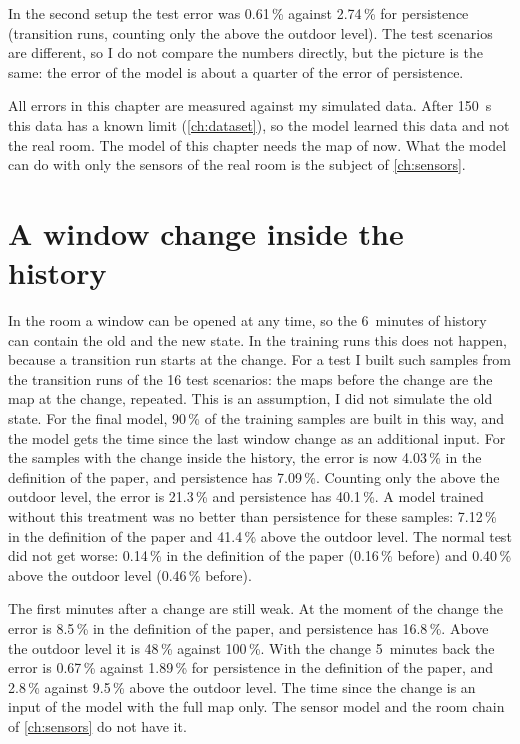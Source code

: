 In the second setup the test error was 0.61\,\% against 2.74\,\% for persistence (transition runs, counting only the
\cotwo{} above the outdoor level). The test scenarios are different, so I do not compare the numbers directly, but
the picture is the same: the error of the model is about a quarter of the error of persistence.

All errors in this chapter are measured against my simulated data. After 150~s this data has a known limit
(\cref{ch:dataset}), so the model learned this data and not the real room. The model of this chapter needs the
\cotwo{} map of now. What the model can do with only the sensors of the real room is the subject of
\cref{ch:sensors}.

\section{A window change inside the history}
\label{sec:winchange}
In the room a window can be opened at any time, so the 6~minutes of history can contain the old and the new
state. In the training runs this does not happen, because a transition run starts at the change. For a test I
built such samples from the transition runs of the 16 test scenarios: the maps before the change are the map at
the change, repeated. This is an assumption, I did not simulate the old state. For the final model, 90\,\% of
the training samples are built in this way, and the model gets the time since the last window change as an
additional input. For the samples with the change inside the history, the error is now 4.03\,\% in the
definition of the paper, and persistence has 7.09\,\%. Counting only the \cotwo{} above the outdoor level, the
error is 21.3\,\% and persistence has 40.1\,\%. A model trained without this treatment was no better than
persistence for these samples: 7.12\,\% in the definition of the paper and 41.4\,\% above the outdoor level.
The normal test did not get worse: 0.14\,\% in the definition of the paper
(0.16\,\% before) and 0.40\,\% above the outdoor level (0.46\,\% before).

The first minutes after a change are still weak. At the moment of the change the error is 8.5\,\% in the
definition of the paper, and persistence has 16.8\,\%. Above the outdoor level it is 48\,\% against 100\,\%.
With the change 5~minutes back the error is 0.67\,\% against 1.89\,\% for persistence in the definition of the
paper, and 2.8\,\% against 9.5\,\% above the outdoor level. The time since the change is an input of the model with the full \cotwo{} map only. The sensor
model and the room chain of \cref{ch:sensors} do not have it.
